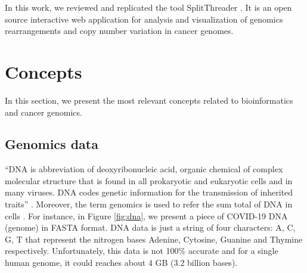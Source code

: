 \documentclass{svproc}
\begin{document}
In this work, we reviewed and replicated the tool SplitThreader \cite{nattestad2016splitthreader}. It is an open source interactive web application for analysis and visualization of genomics rearrangements and copy number variation in cancer genomes. \\




\section{Concepts} 

In this section, we present the most relevant concepts related to bioinformatics and cancer genomics.

\subsection{Genomics data}

``DNA is abbreviation of deoxyribonucleic acid, organic chemical of complex molecular structure that is found in all prokaryotic and eukaryotic cells and in many viruses. DNA codes genetic information for the transmission of inherited traits'' \cite{dna_definition}. Moreover, the term genomics is used to refer the sum total of DNA in cells \cite{archibald2018genomics}. For instance, in Figure \ref{fig:dna}, we present a piece of COVID-19 DNA (genome) in FASTA format. DNA data is just a string of four characters: A, C, G, T that represent the nitrogen bases Adenine, Cytosine, Guanine and Thymine respectively. Unfortunately, this data is not 100\% accurate and for a single human genome, it could reaches about 4 GB (3.2 billion bases).    
\end{document}
